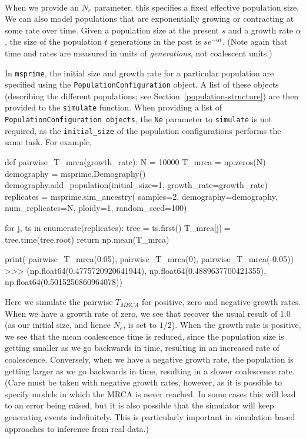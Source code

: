 \documentclass[graybox]{svmult}
\newcommand{\msprime}[0]{\texttt{msprime}}
\begin{document}
\label{exponentially-growingshrinking-populations} \

When we provide an \(N_e\) parameter, this specifies a fixed effective
population size. We can also model populations that are exponentially
growing or contracting at some rate over time. Given a population size
at the present \(s\) and a growth rate \(\alpha\), the size of the
population \(t\) generations in the past is $s e^{-\alpha t}$. (Note
again that time and rates are measured in units of \emph{generations},
not coalescent units.)

In \msprime, the initial size and growth rate for a particular population
are specified using the \texttt{PopulationConfiguration} object. A list
of these objects (describing the different populations; see
Section~\ref{population-structure}) are then provided to the
\texttt{simulate}
function. When providing a list of
\texttt{PopulationConfiguration\ objects}, the \texttt{Ne} parameter to
\texttt{simulate} is not required, as the \texttt{initial\_size} of the
population configurations performs the same task. For example,

\begin{pythoncode}
def pairwise_T_mrca(growth_rate):
    N = 10000
    T_mrca = np.zeros(N)
    demography = msprime.Demography()
    demography.add_population(initial_size=1, growth_rate=growth_rate)
    replicates = msprime.sim_ancestry(
        samples=2,
        demography=demography,
        num_replicates=N,
        ploidy=1,
        random_seed=100)

    for j, ts in enumerate(replicates):
        tree = ts.first()
        T_mrca[j] = tree.time(tree.root)
    return np.mean(T_mrca)

print(
    pairwise_T_mrca(0.05), pairwise_T_mrca(0),
    pairwise_T_mrca(-0.05))
>>> (np.float64(0.4775720920641944),
     np.float64(0.4889637700421355),
     np.float64(0.5015256860964078))
\end{pythoncode}

    Here we simulate the pairwise \(T_{MRCA}\) for positive, zero and
negative growth rates. When we have a growth rate of zero, we see that
recover the usual result of 1.0 (as our initial size, and hence \(N_e\),
is set to \(1/2\)). When the growth rate is positive, we see that the
mean coalescence time is reduced, since the population size is getting
smaller as we go backwards in time, resulting in an increased rate of
coalescence. Conversely, when we have a negative growth rate, the
population is getting larger as we go backwards in time, resulting in a
slower coalescence rate. (Care must be taken with negative growth rates,
however, as it is possible to specify models in which the MRCA is never
reached. In some cases this will lead to an error being raised, but it
is also possible that the simulator will keep generating events
indefinitely. This is particularly important in simulation based
approaches to inference from real data.)
\end{document}
